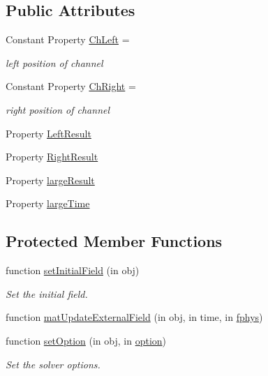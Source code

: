 \subsection*{Public Attributes}
\begin{DoxyCompactItemize}
\item 
Constant Property \hyperlink{class_tidal_river_channel_region2d_a84ce303a94a5d116c671c4116aff6e30}{Ch\+Left} =
\begin{DoxyCompactList}\small\item\em left position of channel \end{DoxyCompactList}\item 
Constant Property \hyperlink{class_tidal_river_channel_region2d_a4a6d72d0e131c1d536b296027cce8ab1}{Ch\+Right} =
\begin{DoxyCompactList}\small\item\em right position of channel \end{DoxyCompactList}\item 
Property \hyperlink{class_tidal_river_channel_region2d_aa0fc6efe8bf6ea41568e75f2dea7c50e}{Left\+Result}
\item 
Property \hyperlink{class_tidal_river_channel_region2d_a36d6bbbd7f0911569b52e964dca831df}{Right\+Result}
\item 
Property \hyperlink{class_tidal_river_channel_region2d_a4ce1d29bb06a772f06d40d5beac4c7ab}{large\+Result}
\item 
Property \hyperlink{class_tidal_river_channel_region2d_a439f37c6320dcd6673cef5f75f8f6011}{large\+Time}
\end{DoxyCompactItemize}
\subsection*{Protected Member Functions}
\begin{DoxyCompactItemize}
\item 
function \hyperlink{class_tidal_river_channel_region2d_ae7b5eb798d58f86777da85ff0bd8320e}{set\+Initial\+Field} (in obj)
\begin{DoxyCompactList}\small\item\em Set the initial field. \end{DoxyCompactList}\item 
function \hyperlink{class_tidal_river_channel_region2d_a97234c2b6cd57f053a3c08371a4629ba}{mat\+Update\+External\+Field} (in obj, in time, in \hyperlink{class_ndg_phys_a6b25724fc9474d32018439009072f0a9}{fphys})
\item 
function \hyperlink{class_tidal_river_channel_region2d_a04f161bd95e94bb3ae029832eea10ea9}{set\+Option} (in obj, in \hyperlink{class_ndg_phys_af91f4c54b93504e76b38a5693774dff1}{option})
\begin{DoxyCompactList}\small\item\em Set the solver options. \end{DoxyCompactList}\end{DoxyCompactItemize}
